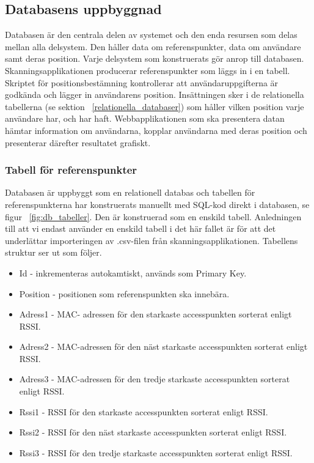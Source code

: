 \documentclass[a4paper,12pt]{article}
\begin{document}
 \subsection{Databasens uppbyggnad}\label{databasen}
 Databasen är den centrala delen av systemet och den enda resursen som delas mellan alla delsystem. Den håller data om referenspunkter, data om användare samt deras position. Varje delsystem som konstruerats gör anrop till databasen. Skanningsapplikationen producerar referenspunkter som läggs in i en tabell. Skriptet för positionsbestämning kontrollerar att användaruppgifterna är godkända och lägger in användarens position. Insättningen sker i de relationella tabellerna (se sektion ~\ref{relationella_databaser}) som håller vilken position varje användare har, och har haft. Webbapplikationen som ska presentera datan hämtar information om användarna, kopplar användarna med deras position och presenterar därefter resultatet grafiskt.



 \subsubsection{Tabell för referenspunkter}
 Databasen är uppbyggt som en relationell databas och tabellen för referenspunkterna har konstruerats manuellt med SQL-kod direkt i databasen, se figur ~\ref{fig:db_tabeller}.
 Den är konstruerad som en enskild tabell. Anledningen till att vi endast använder en enskild tabell i det här fallet är för att det underlättar importeringen av .csv-filen från skanningsapplikationen. Tabellens struktur ser ut som följer.

 \begin{itemize}
   \item Id - inkrementeras autokamtiskt, används som Primary Key.
   \item Position - positionen som referenspunkten ska innebära.
   \item Adress1 - MAC- adressen för den starkaste accesspunkten sorterat enligt RSSI.
   \item Adress2 - MAC-adressen för den näst starkaste accesspunkten sorterat enligt RSSI.
   \item Adress3 - MAC-adressen för den tredje starkaste accesspunkten sorterat enligt RSSI.
   \item Rssi1 - RSSI för den starkaste accesspunkten sorterat enligt RSSI.
   \item Rssi2 - RSSI för den näst starkaste accesspunkten sorterat enligt RSSI.
   \item Rssi3 - RSSI för den tredje starkaste accesspunkten sorterat enligt RSSI.
 \end{itemize}
\end{document}

